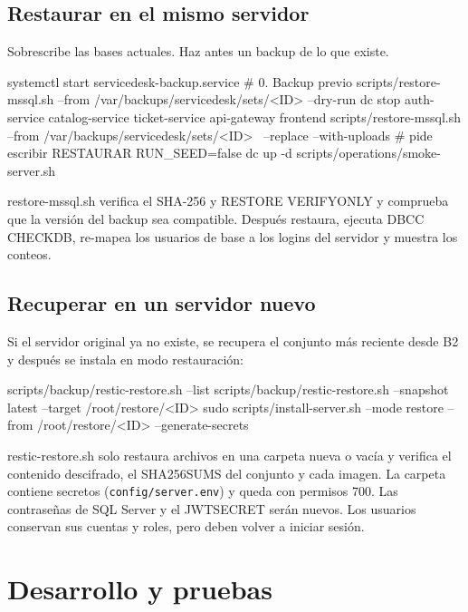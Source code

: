 \documentclass[11pt,a4paper,oneside]{report}
\newcommand{\codus}{\textunderscore\allowbreak}
\DeclareRobustCommand{\cod}[1]{{\small\ttfamily\let\_\codus #1}}
\DeclareRobustCommand{\ruta}[1]{{\small\nolinkurl{#1}}}
\begin{document}
\section{Restaurar en el mismo servidor}
\begin{aviso}
Sobrescribe las bases actuales. Haz antes un backup de lo que existe.
\end{aviso}
\begin{bash}
systemctl start servicedesk-backup.service                     # 0. Backup previo
scripts/restore-mssql.sh --from /var/backups/servicedesk/sets/<ID> --dry-run
dc stop auth-service catalog-service ticket-service api-gateway frontend
scripts/restore-mssql.sh --from /var/backups/servicedesk/sets/<ID> \
     --replace --with-uploads                                    # pide escribir RESTAURAR
RUN_SEED=false dc up -d
scripts/operations/smoke-server.sh
\end{bash}
\cod{restore-mssql.sh} verifica el SHA-256 y \cod{RESTORE VERIFYONLY} y comprueba que la versión del backup sea compatible.
Después restaura, ejecuta \cod{DBCC CHECKDB}, re-mapea los usuarios de base a los logins del servidor y muestra los conteos.

\section{Recuperar en un servidor nuevo}
Si el servidor original ya no existe, se recupera el conjunto más reciente desde B2 y después se
instala en modo restauración:
\begin{bash}
scripts/backup/restic-restore.sh --list
scripts/backup/restic-restore.sh --snapshot latest --target /root/restore/<ID>
sudo scripts/install-server.sh --mode restore --from /root/restore/<ID> --generate-secrets
\end{bash}
\cod{restic-restore.sh} solo restaura archivos en una carpeta nueva o vacía y verifica el contenido
descifrado, el \cod{SHA256SUMS} del conjunto y cada imagen. La carpeta contiene secretos
(\ruta{config/server.env}) y queda con permisos 700. Las contraseñas de SQL Server y el
\cod{JWT\_SECRET} serán nuevos. Los usuarios conservan sus cuentas y roles, pero deben volver a iniciar sesión.

\chapter{Desarrollo y pruebas}\label{cap:pruebas}
\end{document}
